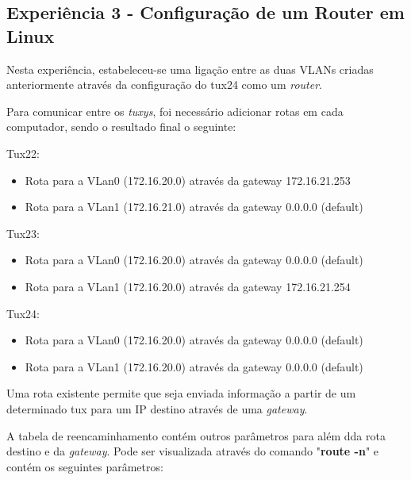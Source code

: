 \documentclass[11pt]{article}
\begin{document}
\subsection{Experiência 3 - Configuração de um Router em Linux}

Nesta experiência, estabeleceu-se uma ligação entre as duas VLANs criadas anteriormente através da configuração do tux24 como um \textit{router}.

Para comunicar entre os \textit{tuxys}, foi necessário adicionar rotas em cada computador, sendo o resultado final o seguinte:

Tux22:
\begin{itemize}
\item Rota para a VLan0 (172.16.20.0) através da gateway 172.16.21.253
\item Rota para a VLan1 (172.16.21.0) através da gateway 0.0.0.0 (default)

\end{itemize}

Tux23:
\begin{itemize}
\item Rota para a VLan0 (172.16.20.0) através da gateway 0.0.0.0 (default)
\item Rota para a VLan1 (172.16.20.0) através da gateway 172.16.21.254

\end{itemize}

Tux24:
\begin{itemize}
\item Rota para a VLan0 (172.16.20.0) através da gateway 0.0.0.0 (default)
\item Rota para a VLan1 (172.16.20.0) através da gateway 0.0.0.0 (default)
	
\end{itemize}

Uma rota existente permite que seja enviada informação a partir de um determinado tux para um IP destino através de uma \textit{gateway}.


A tabela de reencaminhamento contém outros parâmetros para além dda rota destino e da \textit{gateway}. Pode ser visualizada através do comando "\textbf{route -n}" e contém os seguintes parâmetros:
\end{document}
